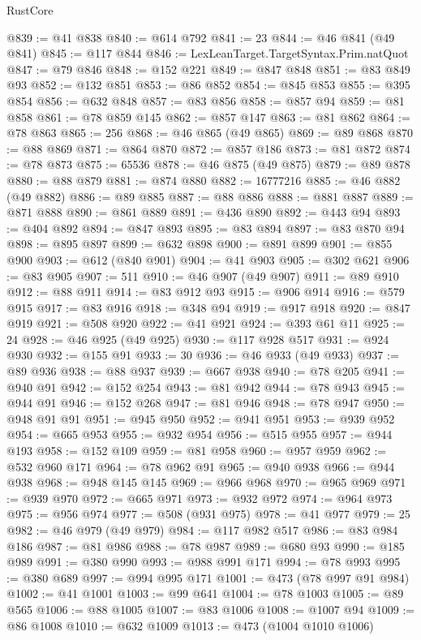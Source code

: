 \begin{lexlean}{RustCore}
\begin{coremodule}
@839 := @41 @838
@840 := @614 @792
@841 := 23
@844 := @46 @841 (@49 @841)
@845 := @117 @844
@846 := LexLeanTarget.TargetSyntax.Prim.natQuot
@847 := @79 @846
@848 := @152 @221
@849 := @847 @848
@851 := @83 @849 @93
@852 := @132 @851
@853 := @86 @852
@854 := @845 @853
@855 := @395 @854
@856 := @632 @848
@857 := @83 @856
@858 := @857 @94
@859 := @81 @858
@861 := @78 @859 @145
@862 := @857 @147
@863 := @81 @862
@864 := @78 @863
@865 := 256
@868 := @46 @865 (@49 @865)
@869 := @89 @868
@870 := @88 @869
@871 := @864 @870
@872 := @857 @186
@873 := @81 @872
@874 := @78 @873
@875 := 65536
@878 := @46 @875 (@49 @875)
@879 := @89 @878
@880 := @88 @879
@881 := @874 @880
@882 := 16777216
@885 := @46 @882 (@49 @882)
@886 := @89 @885
@887 := @88 @886
@888 := @881 @887
@889 := @871 @888
@890 := @861 @889
@891 := @436 @890
@892 := @443 @94
@893 := @404 @892
@894 := @847 @893
@895 := @83 @894
@897 := @83 @870 @94
@898 := @895 @897
@899 := @632 @898
@900 := @891 @899
@901 := @855 @900
@903 := @612 (@840 @901)
@904 := @41 @903
@905 := @302 @621
@906 := @83 @905
@907 := 511
@910 := @46 @907 (@49 @907)
@911 := @89 @910
@912 := @88 @911
@914 := @83 @912 @93
@915 := @906 @914
@916 := @579 @915
@917 := @83 @916
@918 := @348 @94
@919 := @917 @918
@920 := @847 @919
@921 := @508 @920
@922 := @41 @921
@924 := @393 @61 @11
@925 := 24
@928 := @46 @925 (@49 @925)
@930 := @117 @928 @517
@931 := @924 @930
@932 := @155 @91
@933 := 30
@936 := @46 @933 (@49 @933)
@937 := @89 @936
@938 := @88 @937
@939 := @667 @938
@940 := @78 @205
@941 := @940 @91
@942 := @152 @254
@943 := @81 @942
@944 := @78 @943
@945 := @944 @91
@946 := @152 @268
@947 := @81 @946
@948 := @78 @947
@950 := @948 @91 @91
@951 := @945 @950
@952 := @941 @951
@953 := @939 @952
@954 := @665 @953
@955 := @932 @954
@956 := @515 @955
@957 := @944 @193
@958 := @152 @109
@959 := @81 @958
@960 := @957 @959
@962 := @532 @960 @171
@964 := @78 @962 @91
@965 := @940 @938
@966 := @944 @938
@968 := @948 @145 @145
@969 := @966 @968
@970 := @965 @969
@971 := @939 @970
@972 := @665 @971
@973 := @932 @972
@974 := @964 @973
@975 := @956 @974
@977 := @508 (@931 @975)
@978 := @41 @977
@979 := 25
@982 := @46 @979 (@49 @979)
@984 := @117 @982 @517
@986 := @83 @984 @186
@987 := @81 @986
@988 := @78 @987
@989 := @680 @93
@990 := @185 @989
@991 := @380 @990
@993 := @988 @991 @171
@994 := @78 @993
@995 := @380 @689
@997 := @994 @995 @171
@1001 := @473 (@78 @997 @91 @984)
@1002 := @41 @1001
@1003 := @99 @641
@1004 := @78 @1003
@1005 := @89 @565
@1006 := @88 @1005
@1007 := @83 @1006
@1008 := @1007 @94
@1009 := @86 @1008
@1010 := @632 @1009
@1013 := @473 (@1004 @1010 @1006)

\end{coremodule}
\end{lexlean}
